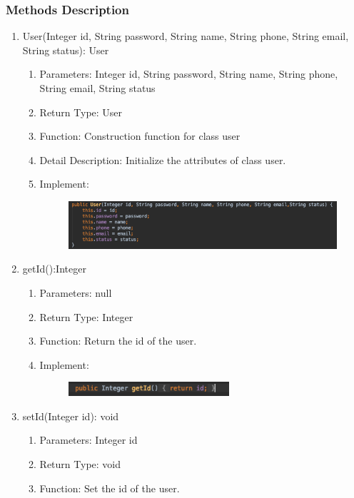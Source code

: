\documentclass[16pt]{scrreprt}
\begin{document}
\subsubsection{Methods Description}
\begin{enumerate}
	\item User(Integer id, String password, String name, String phone, String email, String status): User
	\begin{enumerate}
		\item Parameters: Integer id, String password, String name, String phone, String email, String status
		\item Return Type: User
		\item Function: Construction function for class user
		\item Detail Description: Initialize the attributes of class user.
		\item Implement:
		\begin{figure}[H]
	\centering
	\includegraphics[width=1.\textwidth]{diagrams/userfunc.png}\\
\end{figure}
	\end{enumerate}
	\item getId():Integer 
	\begin{enumerate}
		\item Parameters: null
		\item Return Type: Integer
		\item Function: Return the id of the user.
		\item Implement:
		\begin{figure}[H]
	\centering
	\includegraphics[width=0.6\textwidth]{diagrams/getid.png}\\
\end{figure}
	\end{enumerate}
	\item setId(Integer id): void
	\begin{enumerate}
		\item Parameters: Integer id
		\item Return Type: void
		\item Function: Set the id of the user.

\end{enumerate}
\end{enumerate}
\end{document}
